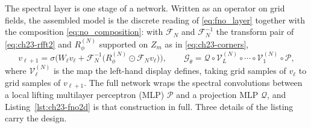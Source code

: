 The spectral layer is one stage of a network. Written as an operator on grid
fields, the assembled model is the discrete reading of \eqref{eq:fno_layer}
together with the composition \eqref{eq:no_composition}:
with $\mathcal{F}_N$ and $\mathcal{F}_N^{-1}$ the transform pair of
\eqref{eq:ch23-rfft2} and $R_\phi^{(N)}$ supported on $Z_m$ as in
\eqref{eq:ch23-corners},
\begin{equation}
  \label{eq:ch23-layer}
  v_{\ell+1} = \sigma\Big( W_\ell v_\ell + \mathcal{F}_N^{-1}\big( R_\phi^{(N)} \odot \mathcal{F}_N v_\ell \big) \Big),
  \qquad
  \mathcal{G}_\theta = \mathcal{Q} \circ \mathcal{V}^{(N)}_L \circ \cdots \circ \mathcal{V}^{(N)}_1 \circ \mathcal{P},
\end{equation}
where $\mathcal{V}^{(N)}_\ell$ is the map the left-hand display defines, taking
grid samples of $v_\ell$ to grid samples of $v_{\ell+1}$.
The full network wraps the spectral convolutions between a local lifting
multilayer perceptron (MLP) $\mathcal{P}$ and a projection MLP $\mathcal{Q}$, and
Listing~\ref{lst:ch23-fno2d} is that construction in full. Three details of the
listing carry the design.

